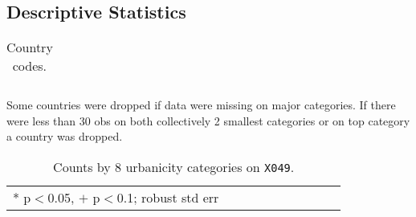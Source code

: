\documentclass[10pt, letterpaper]{article}
\begin{document}
\subsection*{Descriptive Statistics}

\begin{spacing}{.9} \begin{table}[H]\centering  \label{d1} \begin{scriptsize} \begin{tabular}{lllll}\hline
                                                                                        
                                                                                        \hline
                                                                                      \end{tabular}\end{scriptsize}\caption{Country codes.}\end{table} \end{spacing}
        
Some countries were dropped if data were missing on major categories. If there
were less than
30 obs on both collectively 2 smallest categories or on top category a country
was dropped. %

\begin{spacing}{.9} \begin{table}[H]\centering  \label{d1} \begin{scriptsize} \begin{tabular}{llllllllll}\hline  \hline * p$<$0.05, $+$ p$<$0.1; robust std err \end{tabular}\end{scriptsize}\caption{Counts by 8 urbanicity categories on \texttt{X049}.}\end{table} \end{spacing}
\end{document}
